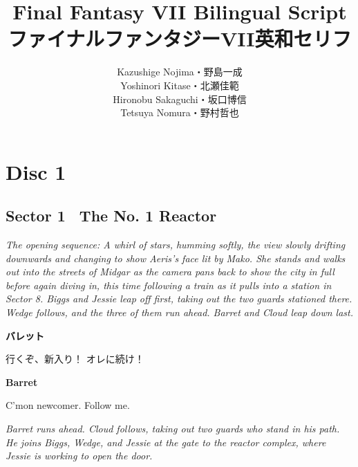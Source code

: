 \documentclass[10pt]{book}
\title{Final Fantasy VII Bilingual Script\\ファイナルファンタジーVII英和セリフ}
\author{Kazushige Nojima・野島一成\\Yoshinori Kitase・北瀬佳範\\Hironobu Sakaguchi・坂口博信\\Tetsuya Nomura・野村哲也}
\newcommand{\leaveSpace}{\vspace{0.0625in}}
\newcommand{\switchEnglish}{\selectlanguage{english} \switchcolumn}
\newcommand{\stageDirection}[1]{{\centering \textcolor{benred8}{\textit{#1}} \par} \leaveSpace}
\newenvironment{paracolSection}
    {\begin{paracol}{2}
    \selectlanguage{japanese}
    }
    {
    \end{paracol}
    \leaveSpace
    }
\newcommand{\BarretEng}{Barret}
\newcommand{\BarretJap}{バレット}
\newcommand{\role}[1]{\noindent \textbf{#1}}
\newcommand{\roleSays}[4]
    {
    \role{#1} \par %
    #3 \par %
    \switchEnglish
    \role{#2} \par %
    #4 \par %
    \leaveSpace
    }
\newcommand{\BarretSays}[2]{\roleSays{\BarretJap}{\BarretEng}{#1}{#2}}
\begin{document}
\maketitle

\chapter*{Disc 1}

\section*{Sector 1 \textemdash\ The No. 1 Reactor}

\stageDirection{The opening sequence: A whirl of stars, humming softly, the view slowly
drifting downwards and changing to show Aeris's face lit by Mako. She stands
and walks out into the streets of Midgar as the camera pans back to show the
city in full before again diving in, this time following a train as it pulls
into a station in Sector 8. Biggs and Jessie leap off first, taking out the two
guards stationed there. Wedge follows, and the three of them run ahead. Barret
and Cloud leap down last.}

\begin{paracolSection}

\BarretSays
{行くぞ、新入り！ オレに続け！}
{C'mon newcomer. Follow me.}

\end{paracolSection}

\stageDirection{Barret runs ahead. Cloud follows, taking out two guards who stand in his path.
He joins Biggs, Wedge, and Jessie at the gate to the reactor complex, where
Jessie is working to open the door.}
\end{document}
